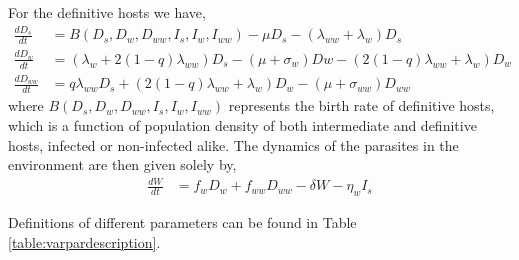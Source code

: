 \documentclass{article}
\begin{document}
For the definitive hosts we have,
\begin{align}
\frac{dD_s}{dt} &= B(D_s,  D_w,  D_{ww},  I_s, I_w, I_{ww})  - \mu D_s - (\lambda_{ww} + \lambda_w) D_s \nonumber \\    
\frac{dD_w}{dt} &= (\lambda_w + 2 (1 - q) \lambda_{ww}) D_s - (\mu + \sigma_w) Dw - (2 (1 - q) \lambda_{ww} + \lambda_w) D_w  \label{odes:dhosts} \\         
\frac{dD_{ww}}{dt} &= q \lambda_{ww} D_s + (2 (1 - q) \lambda_{ww} + \lambda_w) D_w - (\mu + \sigma_{ww}) D_{ww} \nonumber
\end{align}
%
where $B(D_s, D_w, D_{ww}, I_s, I_w, I_{ww})$ represents the birth rate of definitive hosts, which is a function of population density of both intermediate and definitive hosts, infected or non-infected alike. 
The dynamics of the parasites in the environment are then given solely by,
\begin{align}
	\frac{dW}{dt} &= f_w D_w + f_{ww} D_{ww} - \delta W - \eta_w I_s \label{odes:eparasite}
\end{align}


Definitions of different parameters can be found in Table \ref{table:varpardescription}.
\end{document}
